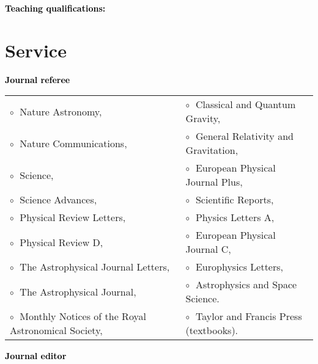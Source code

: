 \vspace{0.2cm}
\textbf{\textcolor{black}{Teaching qualifications:}}\vspace{0.05cm}\\


\section{Service}



\textbf{\textcolor{black}{Journal referee}}\vspace{0.1cm}\\
\begin{tabular}{@{\hskip 0.4cm}l@{\hskip 0.4in}l}
$\circ\;$ Nature Astronomy,  & $\circ\;$  Classical and Quantum Gravity,   \\
$\circ\;$ Nature Communications,  & $\circ\;$   General Relativity and Gravitation,  \\
$\circ\;$ Science, & $\circ\;$  European Physical Journal Plus,  \\
$\circ\;$ Science Advances, & $\circ\;$ Scientific Reports, \\
$\circ\;$ Physical Review Letters, & $\circ\;$ Physics Letters A, \\
$\circ\;$ Physical Review D,  & $\circ\;$ European Physical Journal C,  \\
$\circ\;$  The Astrophysical Journal Letters,  &  $\circ\;$  Europhysics Letters, \\
$\circ\;$ The Astrophysical Journal,  &  $\circ\;$ Astrophysics and Space Science. \\
$\circ\;$  Monthly Notices of the Royal Astronomical Society, & $\circ\;$ Taylor and Francis Press (textbooks). \\
\end{tabular}
\vspace{0.2cm}
\newpage
 \textbf{\textcolor{black}{Journal editor}}\vspace{0.1cm}\\
 \vspace{-0.1cm}
\vspace{0.2cm}


